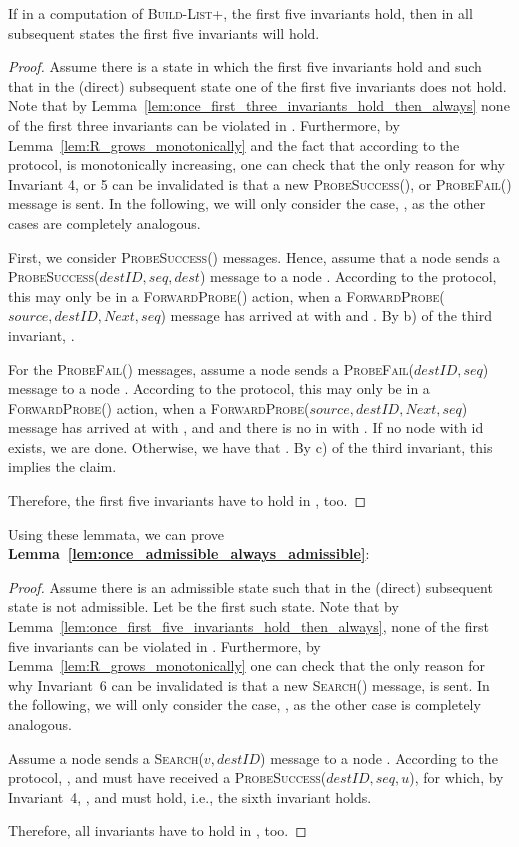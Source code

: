 \documentclass[a4paper,USenglish]{lipics}
\newcommand{\blp}{\textsc{Build-List+}\xspace}
\newcommand{\search}[1]{\textsc{Search(\ensuremath{#1})}\xspace}
\newcommand{\forwardprobe}[1]{\textsc{ForwardProbe(\ensuremath{#1})}\xspace}
\newcommand{\psuccess}[1]{\textsc{ProbeSuccess(\ensuremath{#1})}\xspace}
\newcommand{\pfail}[1]{\textsc{ProbeFail(\ensuremath{#1})}\xspace}
\begin{document}
\begin{lemma}\label{lem:once_first_five_invariants_hold_then_always}
 If in a computation of \blp, the first five invariants hold, then in all subsequent states the first five invariants will hold.
\end{lemma}
\begin{proof}
  Assume there is a state  in which the first five invariants hold and such that in the (direct) subsequent state  one of the first five invariants does not hold.
  Note that by Lemma~\ref{lem:once_first_three_invariants_hold_then_always} none of the first three invariants can be violated in .
	Furthermore, by Lemma~\ref{lem:R_grows_monotonically} and the fact that according to the protocol,  is monotonically increasing, one can check that the only reason for why Invariant 4, or 5 can be invalidated is that a new \psuccess{}, or \pfail{} message is sent.
	In the following, we will only consider the case, , as the other cases are completely analogous.

	First, we consider \psuccess{} messages. Hence, assume that a node  sends a \psuccess{destID,seq,dest} message to a node .
	According to the protocol, this may only be in a \forwardprobe{} action, when a \forwardprobe{source,destID,Next,seq} message has arrived at  with  and .
	By b) of the third invariant, .
	
	For the \pfail{} messages, assume a node  sends a \pfail{destID, seq} message to a node .
	According to the protocol, this may only be in a \forwardprobe{} action, when a \forwardprobe{source,destID,Next,seq} message has arrived at  with ,  and  and there is no  in  with .
	If no node with id  exists, we are done.
	Otherwise, we have that .
	By c) of the third invariant, this implies the claim.
  
	Therefore, the first five invariants have to hold in , too.
\end{proof}
Using these lemmata, we can prove \textbf{Lemma~\ref{lem:once_admissible_always_admissible}}:
\begin{proof}
 Assume there is an admissible state  such that in the (direct) subsequent state  is not admissible.
 Let  be the first such state.
	Note that by Lemma~\ref{lem:once_first_five_invariants_hold_then_always}, none of the first five invariants can be violated in .
	Furthermore, by Lemma~\ref{lem:R_grows_monotonically} one can check that the only reason for why Invariant~6 can be invalidated is that a new \search{} message, is sent.
	In the following, we will only consider the case, , as the other case is completely analogous.

	Assume a node  sends a \search{v, destID} message to a node .
	According to the protocol, , and  must have received a \psuccess{destID,seq,u}, for which, by Invariant~4, , and  must hold, i.e., the sixth invariant holds.
	
	Therefore, all invariants have to hold in , too.
\end{proof}
\end{document}
